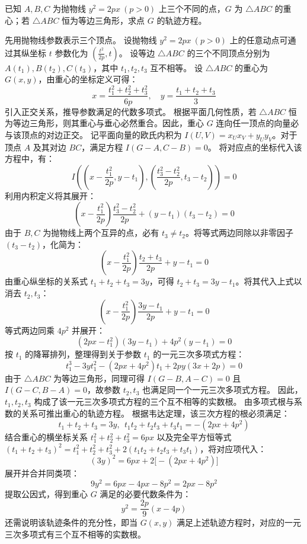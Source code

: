 \begin{example}
已知 $A, B, C$ 为抛物线 \(y^2 = 2px\ (p > 0)\) 上三个不同的点，\(G\) 为 \(\triangle ABC\) 的重心；若 \(\triangle ABC\) 恒为等边三角形，求点 \(G\) 的轨迹方程。
\end{example}
\begin{solution}
先用抛物线参数表示三个顶点。
设抛物线 $y^2 = 2px \ (p > 0)$ 上的任意动点可通过其纵坐标 $t$ 参数化为 $\left(\frac{t^2}{2p}, t\right)$。
设等边 $\triangle ABC$ 的三个不同顶点分别为 $A(t_1), B(t_2), C(t_3)$，其中 $t_1, t_2, t_3$ 互不相等。
设 $\triangle ABC$ 的重心为 $G(x, y)$，由重心的坐标定义可得：
$$ x = \frac{t_1^2 + t_2^2 + t_3^2}{6p}, \quad y = \frac{t_1 + t_2 + t_3}{3} $$
引入正交关系，推导参数满足的代数多项式。
根据平面几何性质，若 $\triangle ABC$ 恒为等边三角形，则其重心与垂心必然重合。因此，重心 $G$ 连向任一顶点的向量必与该顶点的对边正交。
记平面向量的欧氏内积为 $I(U, V) = x_U x_V + y_U y_V$。对于顶点 $A$ 及其对边 $BC$，满足方程 $I(G - A, C - B) = 0$。
将对应点的坐标代入该方程中，有：
$$ I\left( \left(x - \frac{t_1^2}{2p}, y - t_1\right), \left(\frac{t_3^2 - t_2^2}{2p}, t_3 - t_2\right) \right) = 0 $$
利用内积定义将其展开：
$$ \left(x - \frac{t_1^2}{2p}\right) \frac{t_3^2 - t_2^2}{2p} + (y - t_1)(t_3 - t_2) = 0 $$
由于 $B, C$ 为抛物线上两个互异的点，必有 $t_3 \neq t_2$。将等式两边同除以非零因子 $(t_3 - t_2)$，化简为：
$$ \left(x - \frac{t_1^2}{2p}\right) \frac{t_2 + t_3}{2p} + y - t_1 = 0 $$
由重心纵坐标的关系式 $t_1 + t_2 + t_3 = 3y$，可得 $t_2 + t_3 = 3y - t_1$。将其代入上式以消去 $t_2, t_3$：
$$ \left(x - \frac{t_1^2}{2p}\right) \frac{3y - t_1}{2p} + y - t_1 = 0 $$
等式两边同乘 $4p^2$ 并展开：
$$ (2px - t_1^2)(3y - t_1) + 4p^2(y - t_1) = 0 $$
按 $t_1$ 的降幂排列，整理得到关于参数 $t_1$ 的一元三次多项式方程：
$$ t_1^3 - 3y t_1^2 - (2px + 4p^2)t_1 + 2py(3x + 2p) = 0 $$
由于 $\triangle ABC$ 为等边三角形，同理可得 $I(G - B, A - C) = 0$ 且 $I(G - C, B - A) = 0$，故参数 $t_2, t_3$ 也满足同一个一元三次多项式方程。
因此，$t_1, t_2, t_3$ 构成了该一元三次多项式方程的三个互不相等的实数根。
由多项式根与系数的关系可推出重心的轨迹方程。
根据韦达定理，该三次方程的根必须满足：
$$ t_1 + t_2 + t_3 = 3y ,~~ t_1 t_2 + t_2 t_3 + t_3 t_1 = -(2px + 4p^2) $$
结合重心的横坐标关系 $t_1^2 + t_2^2 + t_3^2 = 6px$ 以及完全平方恒等式 $(t_1 + t_2 + t_3)^2 = t_1^2 + t_2^2 + t_3^2 + 2(t_1 t_2 + t_2 t_3 + t_3 t_1)$，将对应项代入：
$$ (3y)^2 = 6px + 2\big[ -(2px + 4p^2) \big] $$
展开并合并同类项：
$$ 9y^2 = 6px - 4px - 8p^2 = 2px - 8p^2 $$
提取公因式，得到重心 $G$ 满足的必要代数条件为：
$$ y^2 = \frac{2p}{9}(x - 4p) $$
还需说明该轨迹条件的充分性，即当 $G(x, y)$ 满足上述轨迹方程时，对应的一元三次多项式有三个互不相等的实数根。

\end{solution}
